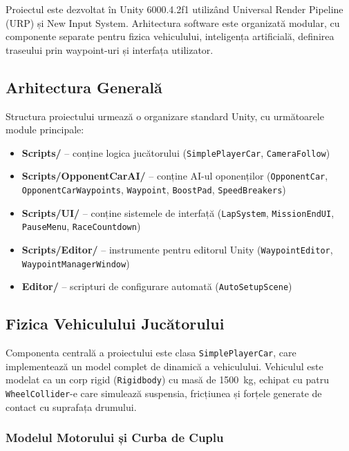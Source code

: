 \documentclass[11pt,twocolumn]{article}
\begin{document}
Proiectul este dezvoltat în Unity 6000.4.2f1 utilizând Universal Render Pipeline (URP) și New Input System. Arhitectura software este organizată modular, cu componente separate pentru fizica vehiculului, inteligența artificială, definirea traseului prin waypoint-uri și interfața utilizator.

\subsection{Arhitectura Generală}

Structura proiectului urmează o organizare standard Unity, cu următoarele module principale:

\begin{itemize}
    \item \textbf{Scripts/} -- conține logica jucătorului (\texttt{SimplePlayerCar}, \texttt{CameraFollow})
    \item \textbf{Scripts/OpponentCarAI/} -- conține AI-ul oponenților (\texttt{OpponentCar}, \texttt{OpponentCarWaypoints}, \texttt{Waypoint}, \texttt{BoostPad}, \texttt{SpeedBreakers})
    \item \textbf{Scripts/UI/} -- conține sistemele de interfață (\texttt{LapSystem}, \texttt{MissionEndUI}, \texttt{PauseMenu}, \texttt{RaceCountdown})
    \item \textbf{Scripts/Editor/} -- instrumente pentru editorul Unity (\texttt{WaypointEditor}, \texttt{WaypointManagerWindow})
    \item \textbf{Editor/} -- scripturi de configurare automată (\texttt{AutoSetupScene})
\end{itemize}

\subsection{Fizica Vehiculului Jucătorului}

Componenta centrală a proiectului este clasa \texttt{SimplePlayerCar}, care implementează un model complet de dinamică a vehiculului. Vehiculul este modelat ca un corp rigid (\texttt{Rigidbody}) cu masă de 1500~kg, echipat cu patru \texttt{WheelCollider}-e care simulează suspensia, fricțiunea și forțele generate de contact cu suprafața drumului.

\subsubsection{Modelul Motorului și Curba de Cuplu}
\end{document}
